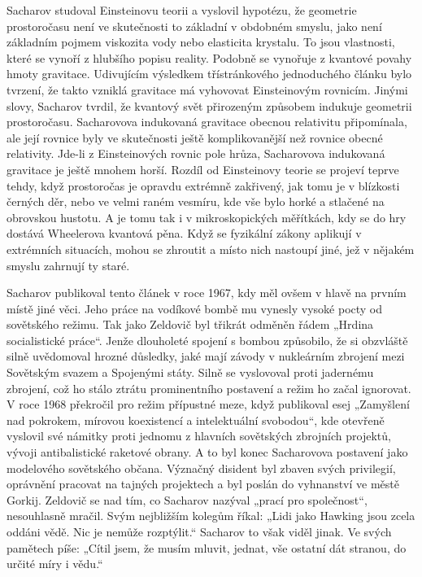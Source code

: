   Sacharov studoval Einsteinovu teorii a vyslovil hypotézu, že geometrie prostoročasu není ve
  skutečnosti to základní v obdobném smyslu, jako není základním pojmem viskozita vody nebo
  elasticita krystalu. To jsou vlastnosti, které se vynoří z hlubšího popisu reality. Podobně se
  vynořuje z kvantové povahy hmoty gravitace. Udivujícím výsledkem třístránkového jednoduchého
  článku bylo tvrzení, že takto vzniklá gravitace má vyhovovat Einsteinovým rovnicím. Jinými slovy,
  Sacharov tvrdil, že kvantový svět přirozeným způsobem indukuje geometrii prostoročasu. Sacharovova
  indukovaná gravitace obecnou relativitu připomínala, ale její rovnice byly ve skutečnosti ještě
  komplikovanější než rovnice obecné relativity. Jde-li z Einsteinových rovnic pole hrůza,
  Sacharovova indukovaná gravitace je ještě mnohem horší. Rozdíl od Einsteinovy teorie se projeví
  teprve tehdy, když prostoročas je opravdu extrémně zakřivený, jak tomu je v blízkosti černých děr,
  nebo ve velmi raném vesmíru, kde vše bylo horké a stlačené na obrovskou hustotu. A je tomu tak i v
  mikroskopických měřítkách, kdy se do hry dostává Wheelerova kvantová pěna. Když se fyzikální
  zákony aplikují v extrémních situacích, mohou se zhroutit a místo nich nastoupí jiné, jež v
  nějakém smyslu zahrnují ty staré. 
  
  Sacharov publikoval tento článek v roce 1967, kdy měl ovšem v hlavě na prvním místě jiné věci.
  Jeho práce na vodíkové bombě mu vynesly vysoké pocty od sovětského režimu. Tak jako Zeldovič byl
  třikrát odměněn řádem „Hrdina socialistické práce“. Jenže dlouholeté spojení s bombou způsobilo,
  že si obzvláště silně uvědomoval hrozné důsledky, jaké mají závody v nukleárním zbrojení mezi
  Sovětským svazem a Spojenými státy. Silně se vyslovoval proti jadernému zbrojení, což ho stálo
  ztrátu prominentního postavení a režim ho začal ignorovat. V roce 1968 překročil pro režim
  přípustné meze, když publikoval esej „Zamyšlení nad pokrokem, mírovou koexistencí a intelektuální
  svobodou“, kde otevřeně vyslovil své námitky proti jednomu z hlavních sovětských zbrojních
  projektů, vývoji antibalistické raketové obrany. A to byl konec Sacharovova postavení jako
  modelového sovětského občana. Význačný disident byl zbaven svých privilegií, oprávnění pracovat na
  tajných projektech a byl poslán do vyhnanství ve městě Gorkij. Zeldovič se nad tím, co Sacharov
  nazýval „prací pro společnost“, nesouhlasně mračil. Svým nejbližším kolegům říkal: „Lidi jako
  Hawking jsou zcela oddáni vědě. Nic je nemůže rozptýlit.“ Sacharov to však viděl jinak. Ve svých
  pamětech píše: „Cítil jsem, že musím mluvit, jednat, vše ostatní dát stranou, do určité míry i
  vědu.“
  
